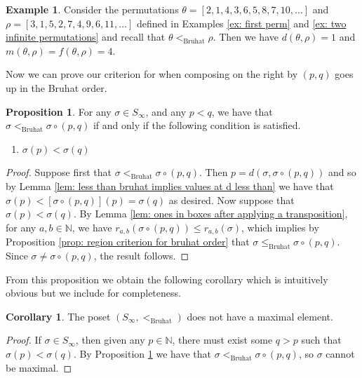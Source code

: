 \documentclass[oneside,11pt,reqno]{amsart}
\newcommand{\nn}{\ensuremath{\mathbb{N}}}
\theoremstyle{definition}
\newtheorem{example}{Example}
\newtheorem{proof techniques}{Proof Techniques}
\newtheorem{corollary}{Corollary}
\newtheorem{proposition}{Proposition}
\begin{document}
\begin{example}
Consider the permutations $\theta = [2,1,4,3,6,5,8,7, 10, \ldots]$ and $\rho = [3, 1, 5, 2, 7, 4, 9, 6, 11 , \ldots ]$ defined in Examples \ref{ex: first perm} and \ref{ex: two infinite permutations} and recall that $\theta <_\text{Bruhat} \rho$. Then we have $d(\theta,\rho) = 1$ and $m(\theta,\rho) = f(\theta,\rho) = 4$. 
\end{example}

Now we can prove our criterion for when composing on the right by $(p , q)$ goes up in the Bruhat order. 

\begin{proposition}\label{prop: transposition going up in bruhat}
    For any $\sigma \in S_\infty$, and any $p < q$, we have that $\sigma <_\text{Bruhat} \sigma \circ (p , q)$ if and only if the following condition is satisfied.
    \begin{enumerate}
        \item[(C1)] $\sigma(p) < \sigma(q)$
    \end{enumerate} 
\end{proposition}

\begin{proof}
Suppose first that $\sigma <_\text{Bruhat} \sigma \circ (p , q)$. Then $p = d(\sigma , \sigma \circ (p, q))$ and so by Lemma \ref{lem: less than bruhat implies values at d less than} we have that $\sigma(p) <[\sigma \circ (p , q)] (p) = \sigma(q)$ as desired. Now suppose that $\sigma(p) < \sigma(q)$. By Lemma \ref{lem: ones in boxes after applying a transposition}, for any $a , b \in \nn$, we have $r_{a, b}( \sigma \circ (p , q) ) \leq r_{a, b}(\sigma)$, which implies by Proposition \ref{prop: region criterion for bruhat order} that $\sigma \leq_\text{Bruhat} \sigma \circ (p , q)$. Since $\sigma \neq \sigma \circ (p , q)$, the result follows. 
\end{proof}

From this proposition we obtain the following corollary which is intuitively obvious but we include for completeness. 

\begin{corollary}\label{cor: no maximal elements}
The poset $(S_\infty , <_\text{Bruhat})$ does not have a maximal element.
\end{corollary}

\begin{proof}
If $\sigma \in S_\infty$, then given any $p \in \nn$, there must exist some $q > p$ such that $\sigma(p) < \sigma(q)$. By Proposition \ref{prop: transposition going up in bruhat} we have that $\sigma <_\text{Bruhat} \sigma \circ (p ,  q)$, so $\sigma$ cannot be maximal. 
\end{proof}
\end{document}

